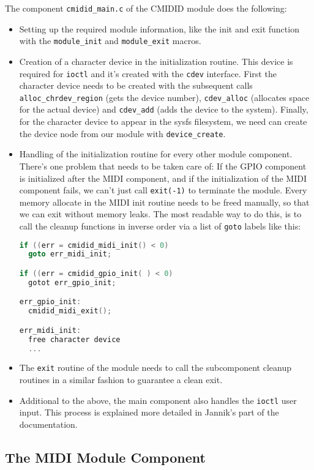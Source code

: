 \documentclass[paper=a4,fontsize=11pt,twocolumn,pagesize,bibtotoc]{scrartcl}
\begin{document}
The component \texttt{cmidid\_main.c} of the CMIDID module does the following:
\begin{itemize}
  \item Setting up the required module information, like the init and exit 
    function with the \texttt{module\_init} and \texttt{module\_exit} macros.
  \item Creation of a character device in the initialization routine. This
    device is required for \texttt{ioctl} and it's created with the \texttt{cdev}
    interface. First the character device needs to be created with the 
    subsequent calls \texttt{alloc\_chrdev\_region} (gets the device number), 
    \texttt{cdev\_alloc} (allocates space for the actual device) and
    \texttt{cdev\_add} (adds the device to the system). Finally, for the character
    device to appear in the sysfs filesystem, we need can create the device 
    node from our module with \texttt{device\_create}.
  \item Handling of the initialization routine for every other module 
    component. There's one problem that needs to be taken care of: If the 
    GPIO component is initialized after the MIDI component, and if the 
    initialization of the MIDI component fails, we can't just call \texttt{exit(-1)}
    to terminate the module. Every memory allocate in the MIDI init routine
    needs to be freed manually, so that we can exit without memory leaks.
    The most readable way to do this, is to call the cleanup functions in 
    inverse order via a list of \texttt{goto} labels like this:
\begin{lstlisting}[language=C]
if ((err = cmidid_midi_init() < 0)
  goto err_midi_init;

if ((err = cmidid_gpio_init( ) < 0)
  gotot err_gpio_init;

err_gpio_init:
  cmidid_midi_exit();

err_midi_init:
  free character device
  ...
\end{lstlisting}
  \item The \texttt{exit} routine of the module needs to call the subcomponent
    cleanup routines in a similar fashion to guarantee a clean exit.
  \item Additional to the above, the main component also handles the \texttt{ioctl}
    user input. This process is explained more detailed in Jannik's part of the 
    documentation.
\end{itemize}

\subsection{The MIDI Module Component}
\label{component:midi}
\end{document}
